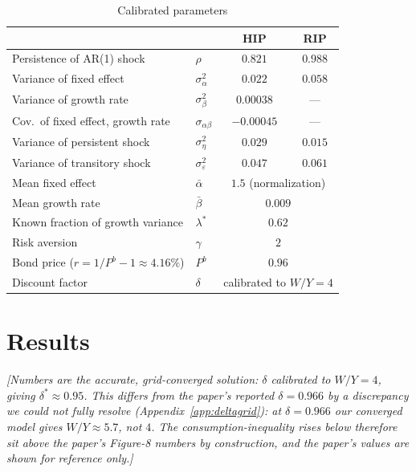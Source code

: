 \documentclass[11pt,fleqn]{article}
\begin{document}
\begin{table}[htbp]
\centering
\caption{Calibrated parameters}
\label{tab:calib}
\begin{tabular}{llcc}
\toprule
 & & HIP & RIP \\
\midrule
Persistence of AR(1) shock        & $\rho$                  & $0.821$   & $0.988$ \\
Variance of fixed effect          & $\sigma^2_\alpha$       & $0.022$   & $0.058$ \\
Variance of growth rate           & $\sigma^2_\beta$        & $0.00038$ & --- \\
Cov.\ of fixed effect, growth rate& $\sigma_{\alpha\beta}$  & $-0.00045$& --- \\
Variance of persistent shock      & $\sigma^2_\eta$         & $0.029$   & $0.015$ \\
Variance of transitory shock      & $\sigma^2_\varepsilon$  & $0.047$   & $0.061$ \\
\midrule
Mean fixed effect                 & $\bar\alpha$            & \multicolumn{2}{c}{$1.5$ (normalization)} \\
Mean growth rate                  & $\bar\beta$             & \multicolumn{2}{c}{$0.009$} \\
Known fraction of growth variance & $\lambda^*$             & \multicolumn{2}{c}{$0.62$} \\
Risk aversion                     & $\gamma$                & \multicolumn{2}{c}{$2$} \\
Bond price ($r=1/P^b-1\approx4.16\%$) & $P^b$               & \multicolumn{2}{c}{$0.96$} \\
Discount factor                   & $\delta$                & \multicolumn{2}{c}{calibrated to $W/Y=4$} \\
\bottomrule
\end{tabular}
\end{table}

\section{Results}

\emph{[Numbers are the accurate, grid-converged solution: $\delta$ calibrated to $W/Y=4$,
giving $\delta^*\approx0.95$. This differs from the paper's reported $\delta=0.966$ by a
discrepancy we could not fully resolve (Appendix~\ref{app:deltagrid}): at $\delta=0.966$
our converged model gives $W/Y\approx5.7$, not $4$. The consumption-inequality rises below
therefore sit above the paper's Figure-8 numbers by construction, and the paper's values
are shown for reference only.]}
\end{document}

